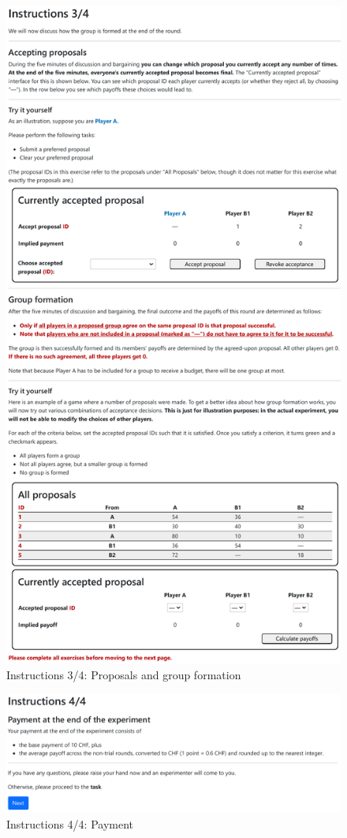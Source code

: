 \begin{figure}[!htb]
    \centering
    \includegraphics[width=.7\linewidth]{screenshots/instructions_3.pdf}
    \caption{Instructions 3/4: Proposals and group formation}
\end{figure}

\begin{figure}[!htb]
    \centering
    \includegraphics[width=.9\linewidth]{screenshots/instructions_4.pdf}
    \caption{Instructions 4/4: Payment}
\end{figure}


